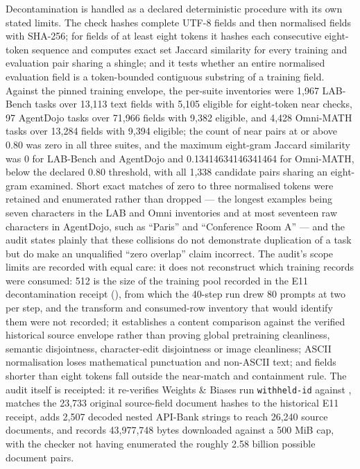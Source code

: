 \documentclass[12pt,a4paper]{report}
\DeclareRobustCommand{\longtok}[1]{\texttt{\seqsplit{#1}}}
\begin{document}
Decontamination is handled as a declared deterministic procedure with
its own stated limits. The check hashes complete UTF-8 fields and then
normalised fields with SHA-256; for fields of at least eight tokens it
hashes each consecutive eight-token sequence and computes exact set
Jaccard similarity for every training and evaluation pair sharing a
shingle; and it tests whether an entire normalised evaluation field is a
token-bounded contiguous substring of a training field. Against the
pinned training envelope, the per-suite inventories were 1,967 LAB-Bench
tasks over 13,113 text fields with 5,105 eligible for eight-token near
checks, 97 AgentDojo tasks over 71,966 fields with 9,382 eligible, and
4,428 Omni-MATH tasks over 13,284 fields with 9,394 eligible; the count
of near pairs at or above 0.80 was zero in all three suites, and the
maximum eight-gram Jaccard similarity was 0 for LAB-Bench and AgentDojo
and 0.13414634146341464 for Omni-MATH, below the declared 0.80
threshold, with all 1,338 candidate pairs sharing an eight-gram
examined. Short exact matches of zero to three normalised tokens were
retained and enumerated rather than dropped --- the longest examples
being seven characters in the LAB and Omni inventories and at most
seventeen raw characters in AgentDojo, such as ``Paris'' and
``Conference Room A'' --- and the audit states plainly that these
collisions do not demonstrate duplication of a task but do make an
unqualified ``zero overlap'' claim incorrect. The audit's scope limits
are recorded with equal care: it does not reconstruct which training
records were consumed: 512 is the size of the training pool recorded in
the E11 decontamination receipt
(\longtok{selected\_\allowbreak{}training\_\allowbreak{}row\_\allowbreak{}count}), from which the 40-step run
drew 80 prompts at two per step, and the transform and consumed-row
inventory that would identify them were not recorded; it establishes a
content comparison against the verified historical source envelope
rather than proving global pretraining cleanliness, semantic
disjointness, character-edit disjointness or image cleanliness; ASCII
normalisation loses mathematical punctuation and non-ASCII text; and
fields shorter than eight tokens fall outside the near-match and
containment rule. The audit itself is receipted: it re-verifies Weights
\& Biases run \texttt{withheld-id} against
\longtok{training\_\allowbreak{}identity\_\allowbreak{}verified.json}, matches the 23,733 original
source-field document hashes to the historical E11 receipt, adds 2,507
decoded nested API-Bank strings to reach 26,240 source documents, and
records 43,977,748 bytes downloaded against a 500 MiB cap, with the
checker not having enumerated the roughly 2.58 billion possible document
pairs.
\end{document}
